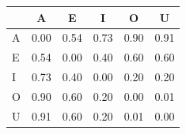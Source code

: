 \begin{tabular}{lccccc}
\toprule
\rowcolor{col01}
 & A & E & I & O & U \\
\midrule
A & 0.00 & 0.54 & 0.73 & 0.90 & 0.91 \\
E & 0.54 & 0.00 & 0.40 & 0.60 & 0.60 \\
I & 0.73 & 0.40 & 0.00 & 0.20 & 0.20 \\
O & 0.90 & 0.60 & 0.20 & 0.00 & 0.01 \\
U & 0.91 & 0.60 & 0.20 & 0.01 & 0.00 \\
\bottomrule
\end{tabular}
